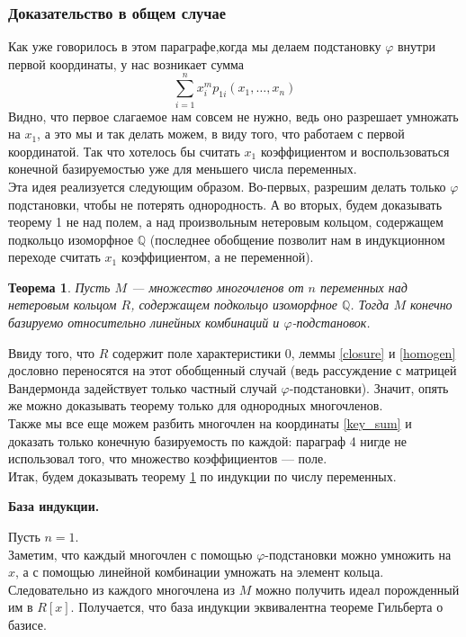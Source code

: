 \documentclass[12pt,a4paper]{article}
\newtheorem{theorem}{Теорема}[section]
\begin{document}
    \subsubsection{Доказательство в общем случае}
    Как уже говорилось в этом параграфе,когда мы делаем подстановку $\varphi$ внутри первой координаты, у нас возникает сумма
    $$\sum\limits_{i=1}^n x_i^m p_{1i}(x_1,\ldots,x_n)$$
    Видно, что первое слагаемое нам совсем не нужно, ведь оно разрешает умножать на $x_1$, а это мы и так делать можем, в виду того, что работаем с первой координатой. Так что хотелось бы считать $x_1$ коэффициентом и воспользоваться конечной базируемостью уже для меньшего числа переменных.\\
    Эта идея реализуется следующим образом. Во-первых, разрешим делать только $\varphi$ подстановки, чтобы не потерять однородность. А во вторых, будем доказывать теорему 1 не над полем, а над произвольным нетеровым кольцом, содержащем подкольцо изоморфное $\mathbb{Q}$ (последнее обобщение позволит нам в индукционном переходе считать $x_1$ коэффициентом, а не переменной).\vskip 0.1in\noindent
    \begin{theorem}
        \label{generalization}
        Пусть $M$ --- множество многочленов от $n$ переменных над нетеровым кольцом $R$, содержащем подкольцо изоморфное $\mathbb{Q}$. Тогда $M$ конечно базируемо относительно линейных комбинаций и $\varphi$-подстановок.
    \end{theorem}\vskip 0.1in\noindent
    Ввиду того, что $R$ содержит поле характеристики $0$, леммы \ref{closure} и \ref{homogen} дословно переносятся на этот обобщенный случай (ведь рассуждение с матрицей Вандермонда задействует только частный случай $\varphi$-подстановки). Значит, опять же можно доказывать теорему только для однородных многочленов.\\
    Также мы все еще можем разбить многочлен на координаты \ref{key_sum} и доказать только конечную базируемость по каждой: параграф 4 нигде не использовал того, что множество коэффициентов --- поле.\\
    Итак, будем доказывать теорему \ref{generalization} по индукции по числу переменных.

    \vskip 0.1in\noindent
    {\large\textbf{База индукции.}}

    Пусть $n=1$.\\
    Заметим, что каждый многочлен с помощью $\varphi$-подстановки можно умножить на $x$, а с помощью линейной комбинации умножать на элемент кольца.\\
    Следовательно из каждого многочлена из $M$ можно получить идеал порожденный им в $R[x]$. Получается, что база индукции эквивалентна теореме Гильберта о базисе.
\end{document}
